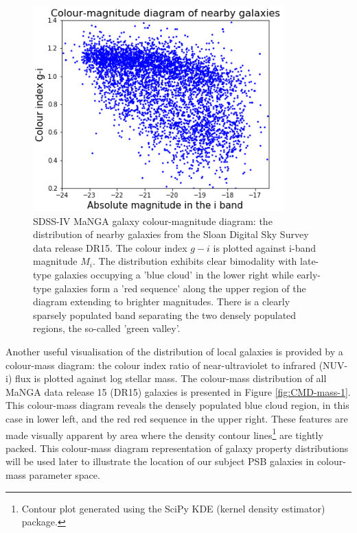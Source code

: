 \begin{figure}
    \centering
    \includegraphics[width=\columnwidth]{images/CMDs/CMD-G_i-i.png}
    \caption[SDSS-IV MaNGA galaxy colour-magnitude diagram]{SDSS-IV MaNGA galaxy colour-magnitude diagram: the distribution of nearby galaxies from the Sloan Digital Sky Survey data release DR15. The colour index $g-i$ is plotted against i-band magnitude $M_i$. The distribution exhibits clear bimodality with late-type galaxies occupying a 'blue cloud' in the lower right while early-type galaxies form a 'red sequence' along the upper region of the diagram extending to brighter magnitudes. There is a clearly sparsely populated band separating the two densely populated regions, the so-called 'green valley'.}
    \label{fig:CMD-G_i-i}
\end{figure}

Another useful visualisation of the distribution of local galaxies is provided by a colour-mass diagram: the colour index ratio of near-ultraviolet to infrared (NUV-i) flux is plotted against log stellar mass. The colour-mass distribution of all MaNGA data release 15 (DR15) galaxies is presented in Figure \ref{fig:CMD-mass-1}. This colour-mass diagram reveals the densely populated blue cloud region, in this case in lower left, and the red red sequence in the upper right. These features are made visually apparent by area where the density contour lines\footnote{Contour plot generated using the SciPy KDE (kernel density estimator) package.} are tightly packed. This colour-mass diagram representation of galaxy property distributions will be used later to illustrate the location of our subject PSB galaxies in colour-mass parameter space.

